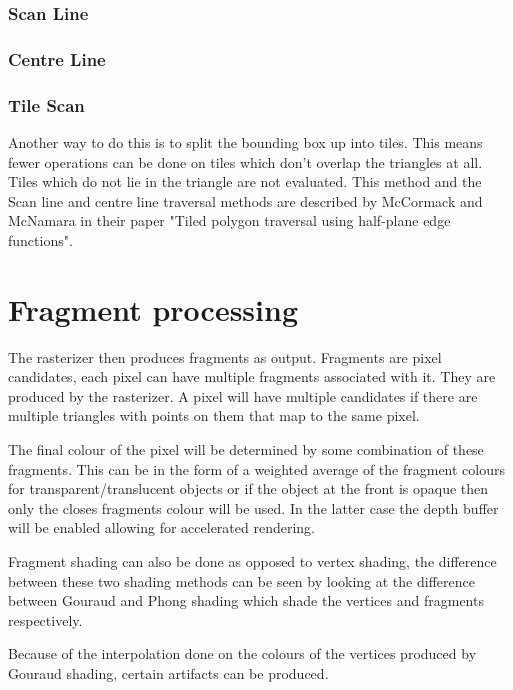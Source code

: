\subsubsection{Scan Line}
\subsubsection{Centre Line}
\subsubsection{Tile Scan}
Another way to do this is to split the bounding box up into tiles. This means fewer operations can be done on tiles which don’t overlap the triangles at all. Tiles which do not lie in the triangle are not evaluated. This method and the Scan line and centre line traversal methods are described by McCormack and McNamara in their paper "Tiled polygon traversal using half-plane edge functions"\cite{McCormackTraversal}. 

\section{Fragment processing}
The rasterizer then produces fragments as output. Fragments are pixel candidates, each pixel can have multiple fragments associated with it. They are produced by the rasterizer. A pixel will have multiple candidates if there are multiple triangles with points on them that map to the same pixel.

The final colour of the pixel will be determined by some combination of these fragments. This can be in the form of a weighted average of the fragment colours for transparent/translucent objects or if the object at the front is opaque then only the closes fragments colour will be used. In the latter case the depth buffer will be enabled allowing for accelerated rendering. 

Fragment shading can also be done as opposed to vertex shading, the difference between these two shading methods can be seen by looking at the difference between Gouraud and Phong shading\cite{gouraudvsphong} which shade the vertices and fragments respectively. 

Because of the interpolation done on the colours of the vertices produced by Gouraud shading, certain artifacts can be produced\cite{gouraudvsphong}.

